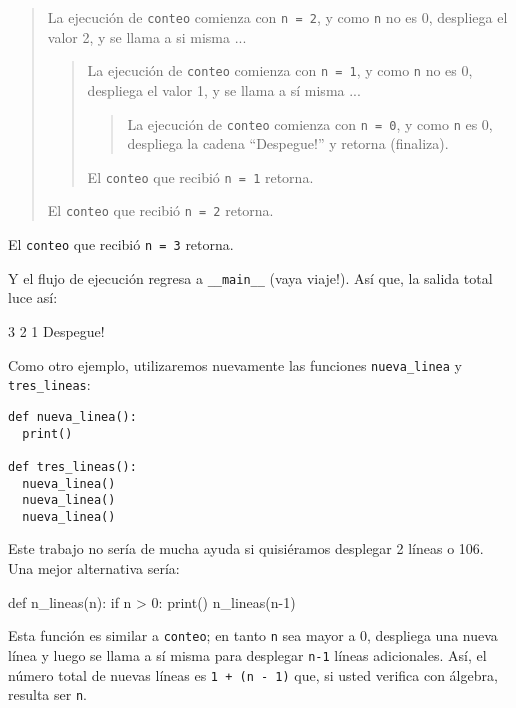 \begin{quote}
	La ejecución de \texttt{conteo} comienza con \texttt{n = 2}, y como
	\texttt{n} no es 0, despliega el valor 2, y se llama a si misma ...
	
	\begin{quote}
		La ejecución de \texttt{conteo} comienza con \texttt{n = 1}, y como
		\texttt{n} no es 0, despliega el valor 1, y se llama a sí misma ...
		
		\begin{quote}
			La ejecución de \texttt{conteo} comienza con \texttt{n = 0}, y como
			\texttt{n} es 0, despliega la cadena ``Despegue!'' y retorna 
			(finaliza).
		\end{quote}
		
		El  \texttt{conteo} que recibió \texttt{n = 1} retorna.
	\end{quote}
	
	El \texttt{conteo} que recibió \texttt{n = 2} retorna.
\end{quote}

El \texttt{conteo} que recibió \texttt{n = 3} retorna.

Y  el flujo de ejecución regresa a \texttt{\_\_main\_\_} (vaya viaje!).  Así que, la 
salida total luce así:

\beforeverb
\begin{pyconcode}
3
2
1
Despegue!
\end{pyconcode}
\afterverb
%

Como otro ejemplo, utilizaremos nuevamente las funciones \texttt{nueva\_linea} y
\texttt{tres\_lineas}:

\beforeverb
\begin{verbatim}
def nueva_linea():
  print()

def tres_lineas():
  nueva_linea()
  nueva_linea()
  nueva_linea()
\end{verbatim}
\afterverb
%

Este trabajo no sería de mucha ayuda si quisiéramos desplegar 2 líneas o 106.
Una mejor alternativa sería:

\beforeverb
\begin{pythoncode}
def n_lineas(n):
  if n > 0:
    print()
    n_lineas(n-1)
\end{pythoncode}
\afterverb
%

Esta función es similar a \texttt{conteo}; en tanto \texttt{n} sea 
mayor a 0, despliega una nueva línea y luego se llama a sí misma
para desplegar \texttt{n-1} líneas adicionales.  Así, el número total de
nuevas líneas es \texttt{1 + (n - 1)} que, si usted verifica con álgebra, 
resulta ser \texttt{n}.

